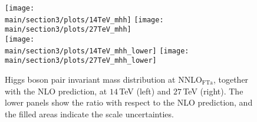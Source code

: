 \begin{figure}[t!]
\begin{center}
\texttt{[image: \\main/section3/plots/14TeV\_mhh]}
\hfill
\texttt{[image: \\main/section3/plots/27TeV\_mhh]}
\\
\texttt{[image: \\main/section3/plots/14TeV\_mhh\_lower]}
\hfill
\texttt{[image: \\main/section3/plots/27TeV\_mhh\_lower]}
\end{center}
\vspace{-2ex}
\caption{\label{fig:mhh_NNLO}
Higgs boson pair invariant mass distribution at NNLO$_{\mathrm{FTa}}$, together with the NLO prediction, at $14\,$TeV (left) and $27\,$TeV (right). The lower panels show the ratio with respect to the NLO prediction, and the filled areas indicate the scale uncertainties.
}
\end{figure}
